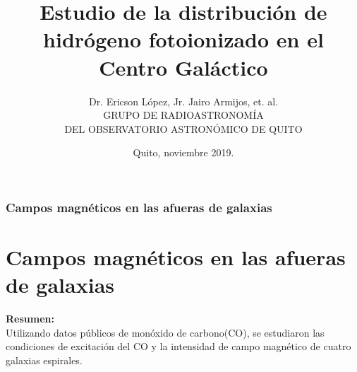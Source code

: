 \documentclass[8pt]{beamer}
\title[ Proyecto Junior PIJ-15-19]{  Estudio de la distribución de hidrógeno fotoionizado en el Centro Galáctico }
\author[Dr. Ericson López, Jr. Jairo Armijos, et. al.]{\large	 Dr. Ericson López, Jr. Jairo Armijos, et. al. \\ \vspace{0.2cm}
GRUPO DE RADIOASTRONOMÍA \\ \vspace{0.2cm} DEL OBSERVATORIO ASTRON\'OMICO DE QUITO}
\date{Quito, noviembre 2019.}
\begin{document}
\begin{frame}

\maketitle
\end{frame}
\begin{frame}
\tableofcontents
\end{frame}
\begin{frame}
\frametitle{Campos magnéticos en las afueras de  galaxias}
\section{Campos magnéticos en las afueras de  galaxias}
\textbf{\big Resumen:}\\
Utilizando datos públicos de monóxido de carbono(CO), se estudiaron las condiciones de excitación del CO y la intensidad de campo magnético de  cuatro galaxias espirales. 

\end{frame}
\end{document}
